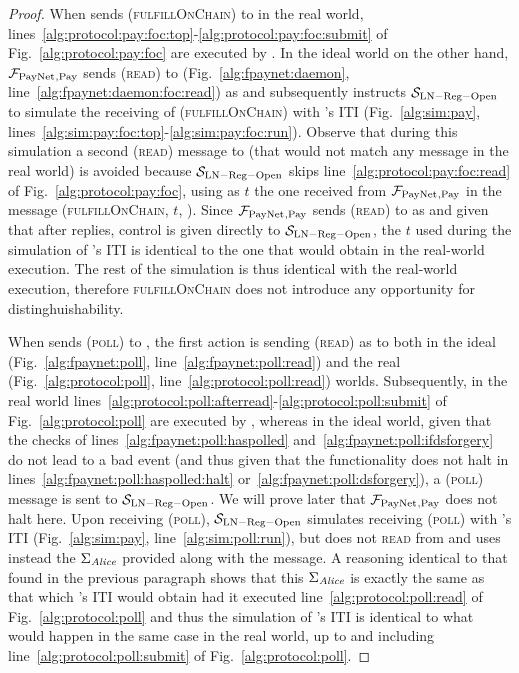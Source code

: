 \begin{proof}
  When \environment{} sends (\textsc{fulfillOnChain}) to \alice{} in the real
  world, lines~\ref{alg:protocol:pay:foc:top}-\ref{alg:protocol:pay:foc:submit}
  of Fig.~\ref{alg:protocol:pay:foc} are executed by \alice. In the ideal world
  on the other hand, $\mathcal{F}_{\mathrm{PayNet}}{}_{\mathrm{, Pay}}$ sends (\textsc{read}) to
  \ledger{} (Fig.~\ref{alg:fpaynet:daemon},
  line~\ref{alg:fpaynet:daemon:foc:read}) as \alice{} and subsequently instructs
  $\mathcal{S}_{\mathrm{LN - Reg - Open}}$ to simulate the receiving of
  (\textsc{fulfillOnChain}) with \alice{}'s ITI (Fig.~\ref{alg:sim:pay},
  lines~\ref{alg:sim:pay:foc:top}-\ref{alg:sim:pay:foc:run}). Observe that
  during this simulation a second (\textsc{read}) message to \ledger{} (that
  would not match any message in the real world) is avoided because
  $\mathcal{S}_{\mathrm{LN - Reg - Open}}$ skips
  line~\ref{alg:protocol:pay:foc:read} of Fig.~\ref{alg:protocol:pay:foc},
  using as $t$ the one received from $\mathcal{F}_{\mathrm{PayNet}}{}_{\mathrm{, Pay}}$ in the
  message (\textsc{fulfillOnChain}, $t$, \alice). Since $\mathcal{F}_{\mathrm{PayNet}}{}_{\mathrm{,
  Pay}}$ sends (\textsc{read}) to \ledger{} as \alice{} and given that after
  \ledger{} replies, control is given directly to $\mathcal{S}_{\mathrm{LN - Reg
  - Open}}$, the $t$ used during the simulation of \alice's ITI is identical to
  the one that \alice{} would obtain in the real-world execution. The rest of
  the simulation is thus identical with the real-world execution, therefore
  \textsc{fulfillOnChain} does not introduce any opportunity for
  distinghuishability.

  When \environment{} sends (\textsc{poll}) to \alice, the first action is
  sending (\textsc{read}) as \alice{} to \ledger{} both in the ideal
  (Fig.~\ref{alg:fpaynet:poll}, line~\ref{alg:fpaynet:poll:read}) and the real
  (Fig.~\ref{alg:protocol:poll}, line~\ref{alg:protocol:poll:read}) worlds.
  Subsequently, in the real world
  lines~\ref{alg:protocol:poll:afterread}-\ref{alg:protocol:poll:submit} of
  Fig.~\ref{alg:protocol:poll} are executed by \alice, whereas in the ideal
  world, given that the checks of lines~\ref{alg:fpaynet:poll:haspolled}
  and~\ref{alg:fpaynet:poll:ifdsforgery} do not lead to a bad event (and thus
  given that the functionality does not halt in
  lines~\ref{alg:fpaynet:poll:haspolled:halt}
  or~\ref{alg:fpaynet:poll:dsforgery}), a (\textsc{poll}) message is sent to
  $\mathcal{S}_{\mathrm{LN - Reg - Open}}$. We will prove later that
  $\mathcal{F}_{\mathrm{PayNet}}{}_{\mathrm{, Pay}}$ does not halt here. Upon receiving
  (\textsc{poll}), $\mathcal{S}_{\mathrm{LN - Reg - Open}}$ simulates receiving
  (\textsc{poll}) with \alice's ITI (Fig.~\ref{alg:sim:pay},
  line~\ref{alg:sim:poll:run}), but does not \textsc{read} from \ledger{} and
  uses instead the $\Sigma_{\mathit{Alice}}$ provided along with the message. A
  reasoning identical to that found in the previous paragraph shows that this
  $\Sigma_{\mathit{Alice}}$ is exactly the same as that which \alice's ITI would obtain
  had it executed line~\ref{alg:protocol:poll:read} of
  Fig.~\ref{alg:protocol:poll} and thus the simulation of \alice's ITI is
  identical to what would happen in the same case in the real world, up to and
  including line~\ref{alg:protocol:poll:submit} of Fig.~\ref{alg:protocol:poll}.


\end{proof}
